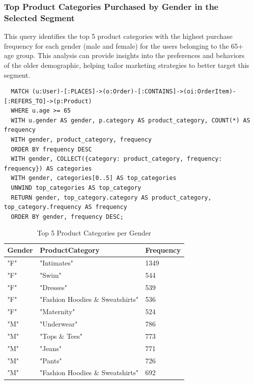 \documentclass[a4paper,12pt]{article}
\begin{document}
\subsubsection{Top Product Categories Purchased by Gender in the Selected Segment}
This query identifies the top 5 product categories with the highest purchase frequency for each gender (male and female) for the users belonging to the 65+ age group.
This analysis can provide insights into the preferences and behaviors of the older demographic, helping tailor marketing strategies to better target this segment.

\begin{verbatim}
  MATCH (u:User)-[:PLACES]->(o:Order)-[:CONTAINS]->(oi:OrderItem)-[:REFERS_TO]->(p:Product)
  WHERE u.age >= 65
  WITH u.gender AS gender, p.category AS product_category, COUNT(*) AS frequency
  WITH gender, product_category, frequency
  ORDER BY frequency DESC
  WITH gender, COLLECT({category: product_category, frequency: frequency}) AS categories
  WITH gender, categories[0..5] AS top_categories
  UNWIND top_categories AS top_category
  RETURN gender, top_category.category AS product_category, top_category.frequency AS frequency
  ORDER BY gender, frequency DESC;
\end{verbatim}

\begin{table}[h!]
  \centering
  \caption{Top 5 Product Categories per Gender}
  \label{tab:processing_data}
  \begin{tabular}{l l l}
      \toprule
      \textbf{Gender} & \textbf{ProductCategory} & \textbf{Frequency} \\
      \midrule
      "F"	& "Intimates" &	1349\\
      "F" & "Swim" & 544 \\
      "F" & "Dresses" & 539 \\
      "F" & "Fashion Hoodies \& Sweatshirts" & 536 \\
      "F" & "Maternity" & 524 \\
      "M" & "Underwear" & 786 \\
      "M" & "Tops \& Tees" & 773 \\
      "M" & "Jeans" & 771 \\
      "M" & "Pants" & 726 \\
      "M" & "Fashion Hoodies \& Sweatshirts" & 692 \\
      \bottomrule
  \end{tabular}
\end{table}
\end{document}
